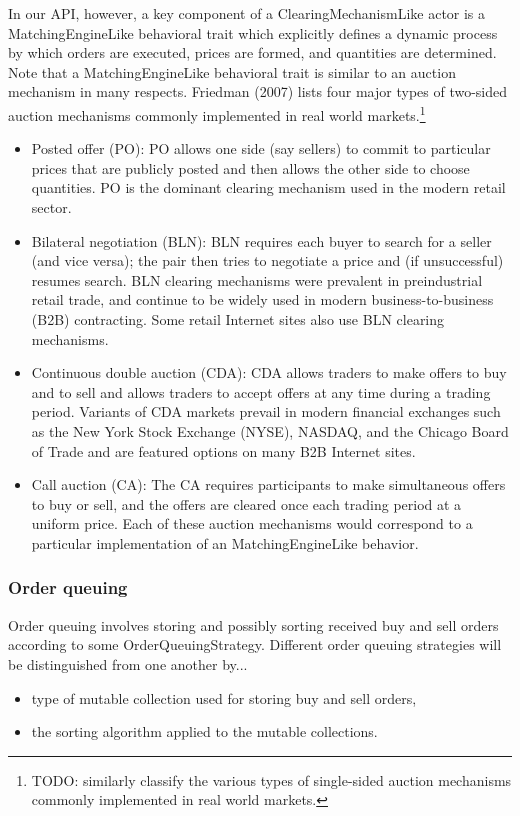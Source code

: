 \documentclass[11pt]{amsart}
\begin{document}
In our API, however, a key component of a ClearingMechanismLike actor is a MatchingEngineLike behavioral trait which explicitly defines a dynamic process by which orders are executed, prices are formed, and quantities are determined. Note that a MatchingEngineLike behavioral trait is similar to an auction mechanism in many respects. Friedman (2007) lists four major types of two-sided auction mechanisms commonly implemented in real world markets.\footnote{
%
TODO: similarly classify the various types of single-sided auction mechanisms commonly implemented
in real world markets.
%
}
\begin{itemize}
    \item Posted offer (PO): PO allows one side (say sellers) to commit to particular prices that are publicly posted and then allows the other side to choose quantities. PO is the dominant clearing mechanism used in the modern retail sector.
    \item Bilateral negotiation (BLN): BLN requires each buyer to search for a seller (and vice versa); the pair then tries to negotiate a price and (if unsuccessful) resumes search. BLN clearing mechanisms were prevalent in preindustrial retail trade, and continue to be widely used in modern business-to-business (B2B) contracting. Some retail Internet sites also use BLN clearing mechanisms.
    \item Continuous double auction (CDA): CDA allows traders to make offers to buy and to sell and allows traders to accept offers at any time during a trading period. Variants of CDA markets prevail in modern financial exchanges such as the New York Stock Exchange (NYSE), NASDAQ, and the Chicago Board of Trade and are featured options on many B2B Internet sites.
    \item Call auction (CA): The CA requires participants to make simultaneous offers to buy or sell, and the offers are cleared once each trading period at a uniform price. Each of these auction mechanisms would correspond to a particular implementation of an MatchingEngineLike behavior.
\end{itemize}

\subsubsection{Order queuing} Order queuing involves storing and possibly sorting received buy and sell orders according to some OrderQueuingStrategy. Different order queuing strategies will be distinguished from one another by...
\begin{itemize}
    \item type of mutable collection used for storing buy and sell orders,
    \item the sorting algorithm applied to the mutable collections.
\end{itemize}
\end{document}
